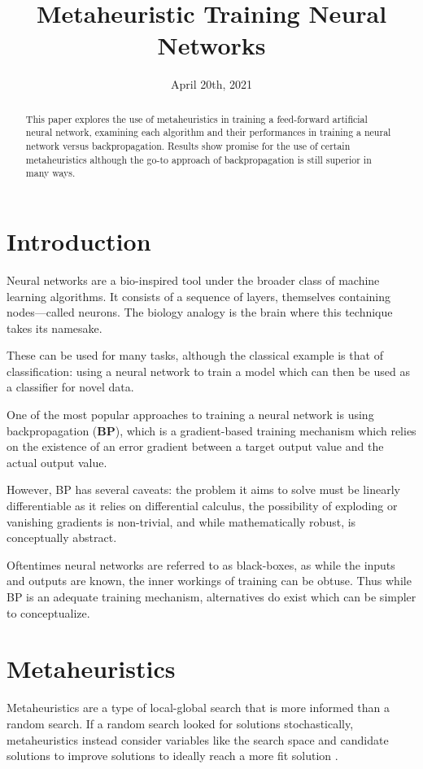 \documentclass[a4paper,12pt]{article}
\title{Metaheuristic Training Neural Networks}
\date{April 20th, 2021}
\begin{document}
\maketitle

\begin{abstract}
This paper explores the use of metaheuristics in training a feed-forward artificial neural network, examining each algorithm and their performances in training a neural network versus backpropagation. Results show promise for the use of certain metaheuristics although the go-to approach of backpropagation is still superior in many ways.
\end{abstract}

\section{Introduction}

Neural networks are a bio-inspired tool under the broader class of machine learning algorithms. It consists of a sequence of layers, themselves containing nodes---called neurons. The biology analogy is the brain where this technique takes its namesake.

These can be used for many tasks, although the classical example is that of classification: using a neural network to train a model which can then be used as a classifier for novel data.

One of the most popular approaches to training a neural network is using backpropagation (\textbf{BP}), which is a gradient-based training mechanism which relies on the existence of an error gradient between a target output value and the actual output value.

However, BP has several caveats: the problem it aims to solve must be linearly differentiable as it relies on differential calculus, the possibility of exploding or vanishing gradients is non-trivial, and while mathematically robust, is conceptually abstract.

Oftentimes neural networks are referred to as black-boxes, as while the inputs and outputs are known, the inner workings of training can be obtuse. Thus while BP is an adequate training mechanism, alternatives do exist which can be simpler to conceptualize.

\section{Metaheuristics}

Metaheuristics are a type of local-global search that is more informed than a random search. If a random search looked for solutions stochastically, metaheuristics instead consider variables like the search space and candidate solutions to improve solutions to ideally reach a more fit solution \cite{mh}.
\end{document}
